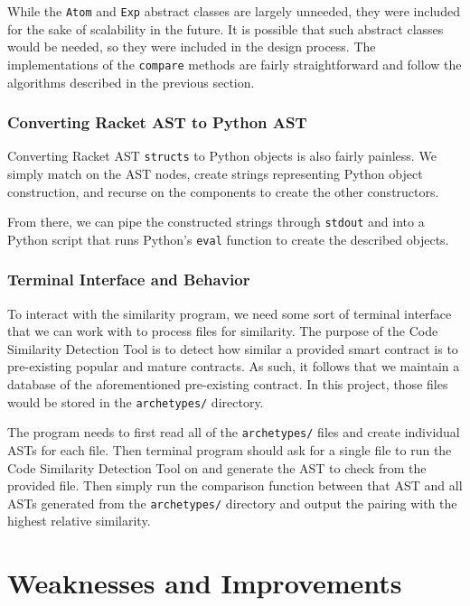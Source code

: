 \documentclass[12pt]{article}
\newcommand{\key}[1]{\texttt{#1}}
\begin{document}
\hfill

While the \key{Atom} and \key{Exp} abstract classes are largely unneeded, they were included for the sake of scalability in the future. It is possible that such abstract classes would be needed, so they were included in the design process. The implementations of the \key{compare} methods are fairly straightforward and follow the algorithms described in the previous section.

\subsubsection{Converting Racket AST to Python AST}

Converting Racket AST \key{structs} to Python objects is also fairly painless. We simply match on the AST nodes, create strings representing Python object construction, and recurse on the components to create the other constructors. 

\hfill

From there, we can pipe the constructed strings through \key{stdout} and into a Python script that runs Python's \key{eval} function to create the described objects.

\subsubsection{Terminal Interface and Behavior}

To interact with the similarity program, we need some sort of terminal interface that we can work with to process files for similarity. The purpose of the Code Similarity Detection Tool is to detect how similar a provided smart contract is to pre-existing popular and mature contracts. As such, it follows that we maintain a database of the aforementioned pre-existing contract. In this project, those files would be stored in the \key{archetypes/} directory.

\hfill

The program needs to first read all of the \key{archetypes/} files and create individual ASTs for each file. Then terminal program should ask for a single file to run the Code Similarity Detection Tool on and generate the AST to check from the provided file. Then simply run the comparison function between that AST and all ASTs generated from the \key{archetypes/} directory and output the pairing with the highest relative similarity.

\section{Weaknesses and Improvements}
\end{document}
